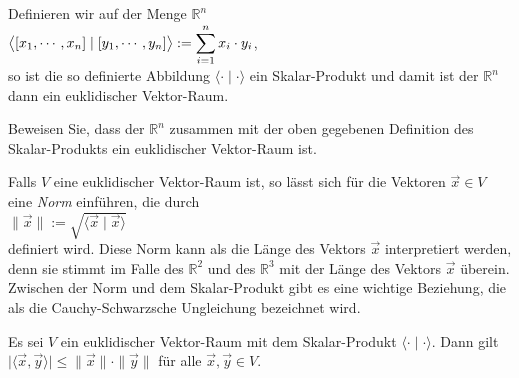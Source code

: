 \example
Definieren wir auf der Menge $\mathbb{R}^n$ 
\\[0.2cm]
\hspace*{1.3cm}
$\displaystyle\bigl\langle [x_1, \cdots, x_n] \mid [y_1, \cdots, y_n] \bigr\rangle := \sum\limits_{i=1}^n x_i \cdot y_i$,
\\[0.2cm]
so ist die so definierte Abbildung $\langle \cdot \mid \cdot \rangle$ ein Skalar-Produkt und damit
ist der $\mathbb{R}^n$ dann ein euklidischer Vektor-Raum.  \eox

\exercise
Beweisen Sie, dass der $\mathbb{R}^n$ zusammen mit der oben gegebenen Definition des Skalar-Produkts
ein euklidischer Vektor-Raum ist.  \eox


Falls $V$ eine euklidischer Vektor-Raum ist, so l\"{a}sst sich f\"{u}r die Vektoren $\vec{x} \in V$ eine \emph{Norm}
einf\"{u}hren, die durch
\\[0.2cm]
\hspace*{1.3cm}
$\|\vec{x}\| := \sqrt{\langle \vec{x} \mid \vec{x} \rangle}$
\\[0.2cm]
definiert wird.  Diese Norm kann als die L\"{a}nge des Vektors $\vec{x}$ interpretiert werden, denn sie
stimmt im Falle des $\mathbb{R}^2$ und des $\mathbb{R}^3$ mit der L\"{a}nge des Vektors $\vec{x}$
\"{u}berein.  Zwischen der Norm und dem Skalar-Produkt gibt es eine wichtige Beziehung, die als die
Cauchy-Schwarzsche Ungleichung bezeichnet wird.

\begin{Satz} \lb
  Es sei $V$ ein euklidischer Vektor-Raum mit dem Skalar-Produkt $\langle \cdot \mid \cdot \rangle$.
  Dann gilt
  \\[0.2cm]
  \hspace*{1.3cm}
  $\bigl|\langle \vec{x}, \vec{y} \rangle\bigr| \leq \| \vec{x} \| \cdot \|\vec{y}\|$ 
  \quad f\"{u}r alle $\vec{x}, \vec{y} \in V$.
\end{Satz}

